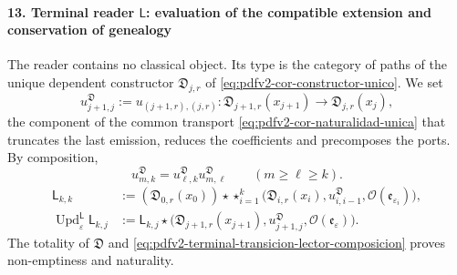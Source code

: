 \paragraph{13. Terminal reader \(\mathsf L\): evaluation of the compatible extension and conservation of genealogy}
The reader contains no classical object. Its type is the category of
paths of the unique dependent constructor
\(\mathfrak D_{j,r}\) of \eqref{eq:pdfv2-cor-constructor-unico}. We set
\begin{equation}
\label{eq:pdfv2-terminal-transicion-lector-tipado}
 u^{\mathfrak D}_{j+1,j}
 :=u_{(j+1,r),(j,r)}:
 \mathfrak D_{j+1,r}(x_{j+1})
 \longrightarrow\mathfrak D_{j,r}(x_j),
\end{equation}
the component of the common transport
\eqref{eq:pdfv2-cor-naturalidad-unica} that truncates the last emission, reduces
the coefficients and precomposes the ports. By composition,
\begin{equation}
\label{eq:pdfv2-terminal-transicion-lector-composicion}
 u^{\mathfrak D}_{m,k}
 =u^{\mathfrak D}_{\ell,k}u^{\mathfrak D}_{m,\ell}
 \qquad(m\geq\ell\geq k).
\end{equation}
\begin{align}
 \mathsf L_{k,k}
 &:=(\mathfrak D_{0,r}(x_0))\star
 \mathop{\star}_{i=1}^{k}
 \bigl(\mathfrak D_{i,r}(x_i),u^{\mathfrak D}_{i,i-1},
       \mathcal O(\mathfrak e_{\varepsilon_i})\bigr),
 \label{eq:pdfv2-terminal-semilla-l}\\
 \operatorname{Upd}^{\mathsf L}_{\varepsilon}\mathsf L_{k,j}
 &:=
 \mathsf L_{k,j}\star
 \bigl(\mathfrak D_{j+1,r}(x_{j+1}),
 u^{\mathfrak D}_{j+1,j},\mathcal O(\mathfrak e_\varepsilon)\bigr).
 \label{eq:pdfv2-terminal-update-l}
\end{align}
The totality of \(\mathfrak D\) and
\eqref{eq:pdfv2-terminal-transicion-lector-composicion} proves non-emptiness
and naturality.

